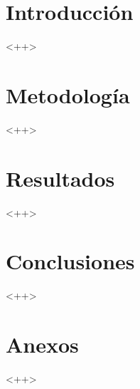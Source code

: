 \documentclass[11pt,transmag,journal,twoside,a4paper]{IEEEtran}
\begin{document}
\renewcommand{\tablename}{Tabla}



\maketitle%

\section{Introducción}

<++>
\section{Metodología}

<++>

\section{Resultados}

<++>


\section{Conclusiones}

<++>

% 
% 

\section{Anexos}

<++>
\end{document}
